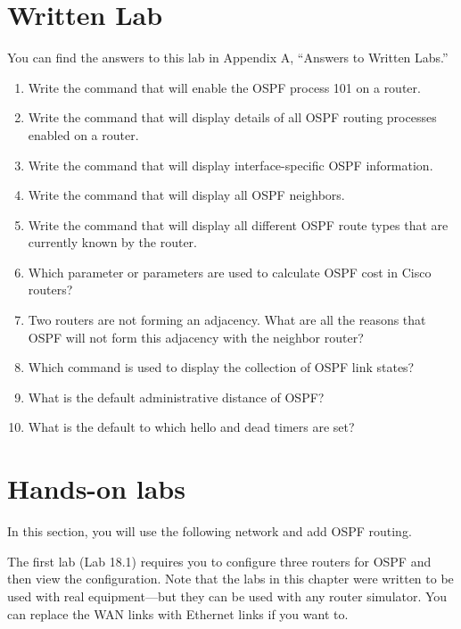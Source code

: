 \section{Written Lab}

You can find the answers to this lab in Appendix A, ``Answers to Written
Labs.''

\begin{enumerate}
\tightlist
\item
  Write the command that will enable the OSPF process 101 on a router.
\item
  Write the command that will display details of all OSPF routing
  processes enabled on a router.
\item
  Write the command that will display interface-specific OSPF
  information.
\item
  Write the command that will display all OSPF neighbors.
\item
  Write the command that will display all different OSPF route types
  that are currently known by the router.
\item
  Which parameter or parameters are used to calculate OSPF cost in Cisco
  routers?
\item
  Two routers are not forming an adjacency. What are all the reasons
  that OSPF will not form this adjacency with the neighbor router?
\item
  Which command is used to display the collection of OSPF link states?
\item
  What is the default administrative distance of OSPF?
\item
  What is the default to which hello and dead timers are set?
\end{enumerate}



\section{Hands-on labs}

In this section, you will use the following network and add OSPF
routing.

\begin{figure}
\centering
\caption{}
\end{figure}

\protect\hypertarget{c18.xhtmlux5cux23Page_773}{}{}The first lab (Lab
18.1) requires you to configure three routers for OSPF and then view the
configuration. Note that the labs in this chapter were written to be
used with real equipment---but they can be used with any router
simulator. You can replace the WAN links with Ethernet links if you want
to.

